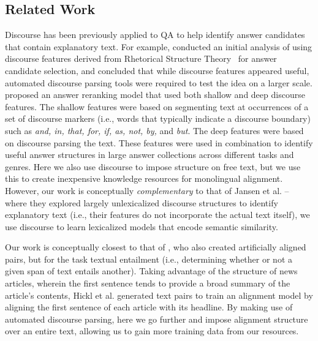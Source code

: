 \subsection{Related Work}
Discourse has been previously applied to QA to help identify answer candidates that contain explanatory text.  For example, \citet{Verberne:2007} conducted an initial analysis of using discourse features derived from Rhetorical Structure Theory~\citep[RST;][]{mann88} for answer candidate selection, and concluded that while discourse features appeared useful, automated discourse parsing tools were required to test the idea on a larger scale.  
\citet{jansen14} proposed an answer reranking model that used both shallow and deep discourse features.  The shallow features were based on segmenting text at occurrences of a set of discourse markers \citep{marcu97} (i.e., words that typically indicate a discourse boundary) such as \textit{and, in, that, for, if, as, not, by,} and \textit{but}.  The deep features were based on discourse parsing the text.  These features were used in combination to identify useful answer structures in large answer collections across different tasks and genres.  Here we also use discourse to impose structure on free text, but we use this to create inexpensive knowledge resources for monolingual alignment. However, our work is conceptually \textit{complementary} to that of Jansen et al. -- where they explored largely unlexicalized discourse structures to identify explanatory text (i.e., their features do not incorporate the actual text itself), we use discourse to learn lexicalized models that encode semantic similarity.

Our work is conceptually closest to that of \citet{hickl2006recognizing}, who also created artificially aligned pairs, but for the task textual entailment (i.e., determining whether or not a given span of text entails another).  Taking advantage of the structure of news articles, wherein the first sentence tends to provide a broad summary of the article's contents, Hickl et al. generated text pairs to train an alignment model by aligning the first sentence of each article with its headline.  By making use of automated discourse parsing, here we go further and impose alignment structure over an entire text, allowing us to gain more training data from our resources.

